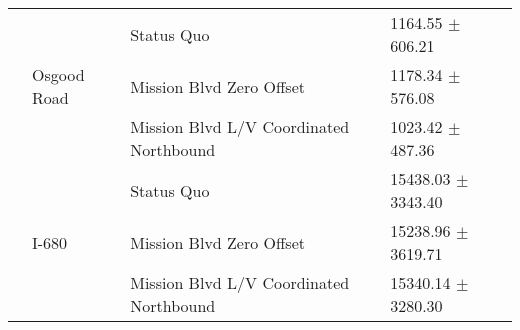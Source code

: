 \begin{table}
\begin{tabular}{llll}
 & \multirow[t]{3}{*}{Osgood Road} & Status Quo & 1164.55 $\pm$ 606.21 \\
 &  & Mission Blvd Zero Offset & 1178.34 $\pm$ 576.08 \\
 &  & Mission Blvd L/V Coordinated Northbound & 1023.42 $\pm$ 487.36 \\
 & \multirow[t]{3}{*}{I-680} & Status Quo & 15438.03 $\pm$ 3343.40 \\
 &  & Mission Blvd Zero Offset & 15238.96 $\pm$ 3619.71 \\
 &  & Mission Blvd L/V Coordinated Northbound & 15340.14 $\pm$ 3280.30 \\
\bottomrule
\end{tabular}
\end{table}
